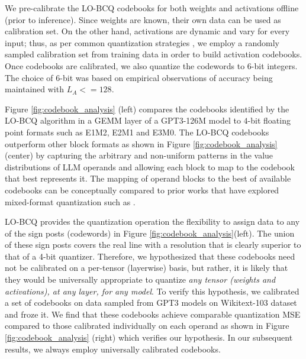 We pre-calibrate the LO-BCQ codebooks for both weights and activations offline (prior to inference). Since weights are known, their own data can be used as calibration set. On the other hand, activations are dynamic and vary for every input; thus, as per common quantization strategies \citep{Hao2020nvintquant,csakr2022optimal}, we employ a randomly sampled calibration set from training data in order to build activation codebooks. Once codebooks are calibrated, we also quantize the codewords to $6$-bit integers. The choice of $6$-bit was based on empirical observations of accuracy being maintained with $L_A <= 128$.

Figure \ref{fig:codebook_analysis} (left) compares the codebooks identified by the LO-BCQ algorithm in a GEMM layer of a GPT3-126M model to $4$-bit floating point formats such as E1M2, E2M1 and E3M0. The LO-BCQ codebooks outperform other block formats as shown in Figure \ref{fig:codebook_analysis} (center) by capturing the arbitrary and non-uniform patterns in the value distributions of LLM operands and allowing each block to map to the codebook that best represents it. The mapping of operand blocks to the best of available codebooks can be conceptually compared to prior works that have explored mixed-format quantization such as \citep{thierry2020adafloat,ahzadeh2022mokey}. 

LO-BCQ provides the quantization operation the flexibility to assign data to any of the sign posts (codewords) in Figure \ref{fig:codebook_analysis}(left). The union of these sign posts covers the real line with a resolution that is clearly superior to that of a 4-bit quantizer. Therefore, we hypothesized that these codebooks need not be calibrated on a per-tensor (layerwise) basis, but rather, it is likely that they would be universally appropriate to quantize \emph{any tensor (weights and activations), at any layer, for any model}. To verify this hypothesis, we calibrated a set of codebooks on data sampled from GPT3 models on Wikitext-103 dataset and froze it. We find that these codebooks achieve comparable quantization MSE compared to those calibrated individually on each operand as shown in Figure \ref{fig:codebook_analysis} (right) which verifies our hypothesis. In our subsequent results, we always employ universally calibrated codebooks.

